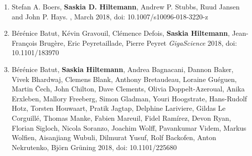 \begin{enumerate}
\item Stefan A. Boers, \textbf{Saskia D. Hiltemann}, Andrew P. Stubbs, Ruud Jansen and John P. Hays. {\color{chaptergrey}{Development and evaluation of a culture-free microbiota profiling platform (MYcrobiota) for clinical diagnostics}}, March 2018, doi: 10.1007/s10096-018-3220-z

\item Bérénice Batut, Kévin Gravouil, Clémence Defois, \textbf{Saskia Hiltemann}, Jean-François Brugère, Eric Peyretaillade, Pierre Peyret {\color{chaptergrey}{ASaiM: a Galaxy-based framework to analyze raw shotgun data from microbiota.}} \textit{GigaScience} 2018, doi: 10.1101/183970

\item Bérénice Batut, \textbf{Saskia Hiltemann}, Andrea Bagnacani, Dannon Baker, Vivek Bhardwaj, Clemens Blank, Anthony Bretaudeau, Loraine Guéguen, Martin Čech, John Chilton, Dave Clements, Olivia Doppelt-Azeroual, Anika Erxleben, Mallory Freeberg, Simon Gladman, Youri Hoogstrate, Hans-Rudolf Hotz, Torsten Houwaart, Pratik Jagtap, Delphine Lariviere, Gildas Le Corguillé, Thomas Manke, Fabien Mareuil, Fidel Ramírez, Devon Ryan, Florian Sigloch, Nicola Soranzo, Joachim Wolff, Pavankumar Videm, Markus Wolfien, Aisanjiang Wubuli, Dilmurat Yusuf, Rolf Backofen, Anton Nekrutenko, Björn Grüning {\color{chaptergrey}{Community-driven data analysis training for biology.}} 2018, doi: 10.1101/225680

\end{enumerate}
